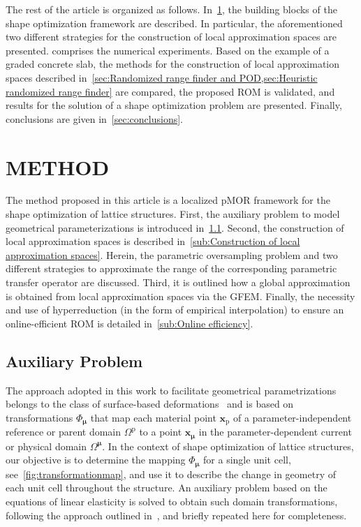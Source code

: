 \documentclass[a4paper]{eccomas_paper-2024}
\begin{document}
The rest of the article is organized as follows.
In~\cref{sec:method}, the building blocks of the shape optimization framework are described.
In particular, the aforementioned two different strategies for the construction of local approximation spaces are presented.
 comprises the numerical experiments.
Based on the example of a graded concrete slab, the methods for the construction of local approximation spaces described in~\cref{sec:Randomized range finder and POD,sec:Heuristic randomized range finder} are compared, the proposed ROM is validated, and results for the solution of a shape optimization problem are presented.
Finally, conclusions are given in~\cref{sec:conclusions}.

\section{METHOD}%
\label{sec:method}
The method proposed in this article is a localized pMOR framework for the shape optimization of lattice structures.
First, the auxiliary problem to model geometrical parameterizations is introduced in~\cref{sub:Auxiliary Problem}.
Second, the construction of local approximation spaces is described in~\cref{sub:Construction of local approximation spaces}.
Herein, the parametric oversampling problem and two different strategies to approximate the range of the corresponding parametric transfer operator are discussed.
Third, it is outlined how a global approximation is obtained from local approximation spaces via the GFEM.
Finally, the necessity and use of hyperreduction (in the form of empirical interpolation) to ensure an online-efficient ROM is detailed in~\cref{sub:Online efficiency}.

\subsection{Auxiliary Problem} %
\label{sub:Auxiliary Problem}
The approach adopted in this work to facilitate geometrical parametrizations belongs to the class of surface-based deformations~\cite{Botsch2010Polygon} and is based on transformations $\Phi_{\bm\mu}$ that map each material point $\bm{x}_{\mathrm{p}}$ of a parameter-independent reference or parent domain $\varOmega^{\mathrm{p}}$ to a point $\bm{x}_{\bm\mu}$ in the parameter-dependent current or physical domain $\varOmega^{\bm\mu}$.
In the context of shape optimization of lattice structures, our objective is to determine the mapping $\Phi_{\bm\mu}$ for a single unit cell, see~\cref{fig:transformationmap}, and use it to describe the change in geometry of each unit cell throughout the structure.
An auxiliary problem based on the equations of linear elasticity is solved to obtain such domain transformations, following the approach outlined in~\cite{Guo2022Learning}, and briefly repeated here for completeness.
\end{document}
